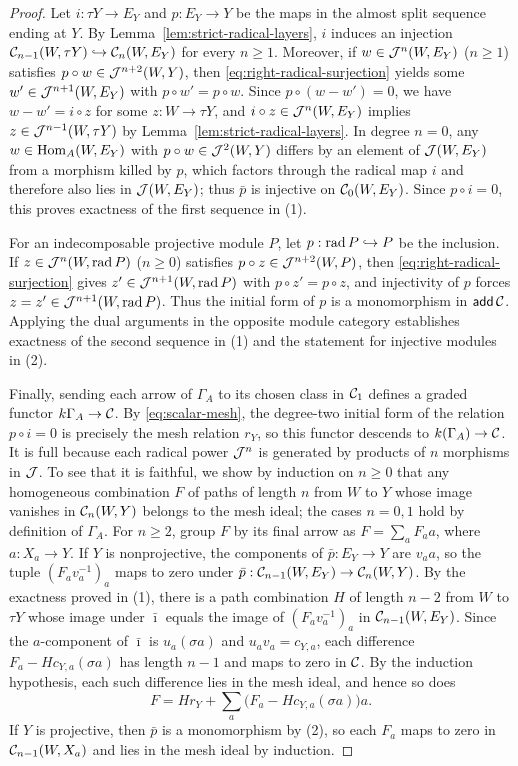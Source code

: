 \begin{proof}
Let $i:\tau Y\to E_Y$ and $p:E_Y\to Y$ be the maps in the almost split
sequence ending at $Y$. By Lemma~\ref{lem:strict-radical-layers}, $i$ induces
an injection $\mathcal C_{n-1}(W,\tau Y)\hookrightarrow\mathcal C_n(W,E_Y)$ for every
$n\geq1$. Moreover, if $w\in \mathcal J^n(W,E_Y)$ ($n\geq1$) satisfies
$p\circ w\in \mathcal J^{n+2}(W,Y)$, then \eqref{eq:right-radical-surjection} yields
some $w'\in \mathcal J^{n+1}(W,E_Y)$ with $p\circ w'=p\circ w$. Since
$p\circ(w-w')=0$, we have $w-w'=i\circ z$ for some $z:W\to\tau Y$, and
$i\circ z\in \mathcal J^n(W,E_Y)$ implies $z\in \mathcal J^{n-1}(W,\tau Y)$ by
Lemma~\ref{lem:strict-radical-layers}. In degree $n=0$, any
$w\in\operatorname{Hom}_A(W,E_Y)$ with $p\circ w\in \mathcal J^2(W,Y)$ differs by an element of
$\mathcal J(W,E_Y)$ from a morphism killed by $p$, which factors through the radical
map $i$ and therefore also lies in $\mathcal J(W,E_Y)$; thus $\bar p$ is injective on
$\mathcal C_0(W,E_Y)$. Since $p\circ i=0$, this proves exactness of the first
sequence in (1).

For an indecomposable projective module $P$, let $p:\operatorname{rad} P\hookrightarrow P$
be the inclusion. If $z\in \mathcal J^n(W,\operatorname{rad} P)$ ($n\geq0$) satisfies
$p\circ z\in \mathcal J^{n+2}(W,P)$, then \eqref{eq:right-radical-surjection} gives
$z'\in \mathcal J^{n+1}(W,\operatorname{rad} P)$ with $p\circ z'=p\circ z$, and injectivity of $p$
forces $z=z'\in \mathcal J^{n+1}(W,\operatorname{rad} P)$. Thus the initial form of $p$ is a
monomorphism in $\operatorname{\mathsf{add}}\mathcal C$. Applying the dual arguments in the opposite module
category establishes exactness of the second sequence in (1) and the
statement for injective modules in (2).

Finally, sending each arrow of $\Gamma_A$ to its chosen class in $\mathcal C_1$
defines a graded functor $k\Gamma_A\to\mathcal C$. By \eqref{eq:scalar-mesh}, the
degree-two initial form of the relation $p\circ i=0$ is precisely the mesh
relation $r_Y$, so this functor descends to $k(\Gamma_A)\to\mathcal C$. It is full
because each radical power $\mathcal J^n$ is generated by products of $n$ morphisms
in $\mathcal J$. To see that it is faithful, we show by induction on $n\geq0$ that any
homogeneous combination $F$ of paths of length $n$ from $W$ to $Y$ whose
image vanishes in $\mathcal C_n(W,Y)$ belongs to the mesh ideal; the cases $n=0,1$
hold by definition of $\Gamma_A$. For $n\geq2$, group $F$ by its final arrow
as $F=\sum_a F_a a$, where $a:X_a\to Y$. If $Y$ is nonprojective, the
components of $\bar p:E_Y\to Y$ are $v_a a$, so the tuple
$(F_a v_a^{-1})_a$ maps to zero under $\bar p:\mathcal C_{n-1}(W,E_Y)\to\mathcal C_n(W,Y)$.
By the exactness proved in (1), there is a path combination $H$ of length
$n-2$ from $W$ to $\tau Y$ whose image under $\bar\imath$ equals the image of
$(F_a v_a^{-1})_a$ in $\mathcal C_{n-1}(W,E_Y)$. Since the $a$-component of
$\bar\imath$ is $u_a(\sigma a)$ and $u_a v_a=c_{Y,a}$, each difference
$F_a - H c_{Y,a}(\sigma a)$ has length $n-1$ and maps to zero in $\mathcal C$. By
the induction hypothesis, each such difference lies in the mesh ideal, and
hence so does
\[
 F = H r_Y + \sum_a \bigl(F_a - H c_{Y,a}(\sigma a)\bigr)a.
\]
If $Y$ is projective, then $\bar p$ is a monomorphism by (2), so each $F_a$
maps to zero in $\mathcal C_{n-1}(W,X_a)$ and lies in the mesh ideal by induction.
\end{proof}

